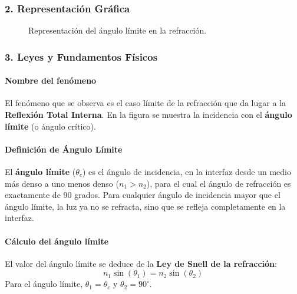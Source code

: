 \subsubsection*{2. Representación Gráfica}
\begin{figure}[H]
    \centering
    \caption{Representación del ángulo límite en la refracción.}
\end{figure}

\subsubsection*{3. Leyes y Fundamentos Físicos}
\paragraph*{Nombre del fenómeno}
El fenómeno que se observa es el caso límite de la refracción que da lugar a la \textbf{Reflexión Total Interna}. En la figura se muestra la incidencia con el \textbf{ángulo límite} (o ángulo crítico).

\paragraph*{Definición de Ángulo Límite}
El \textbf{ángulo límite} ($\theta_c$) es el ángulo de incidencia, en la interfaz desde un medio más denso a uno menos denso ($n_1 > n_2$), para el cual el ángulo de refracción es exactamente de 90 grados. Para cualquier ángulo de incidencia mayor que el ángulo límite, la luz ya no se refracta, sino que se refleja completamente en la interfaz.

\paragraph*{Cálculo del ángulo límite}
El valor del ángulo límite se deduce de la \textbf{Ley de Snell de la refracción}:
$$ n_1 \sin(\theta_1) = n_2 \sin(\theta_2) $$
Para el ángulo límite, $\theta_1 = \theta_c$ y $\theta_2 = 90^\circ$.


